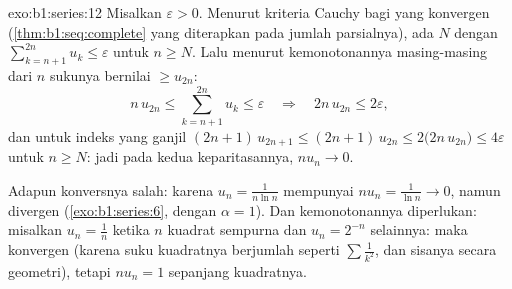 \begin{solution}{exo:b1:series:12}
Misalkan $\varepsilon > 0$. Menurut kriteria Cauchy bagi
 yang konvergen (\cref{thm:b1:seq:complete} yang diterapkan pada
jumlah parsialnya), ada $N$ dengan $\sum_{k=n+1}^{2n} u_k \leq
\varepsilon$ untuk $n \geq N$. Lalu menurut kemonotonannya masing-masing dari $n$
sukunya bernilai $\geq u_{2n}$:
\[
n\,u_{2n} \leq \sum_{k=n+1}^{2n} u_k \leq \varepsilon
\quad\Longrightarrow\quad 2n\,u_{2n} \leq 2\varepsilon ,
\]
dan untuk indeks yang ganjil $(2n+1)\,u_{2n+1} \leq (2n+1)\,u_{2n} \leq
2\bigl(2n\,u_{2n}\bigr) \leq 4\varepsilon$ untuk $n \geq N$: jadi pada
kedua keparitasannya, $n u_n \to 0$.

Adapun konversnya salah: karena $u_n = \frac{1}{n\ln n}$ mempunyai $n u_n =
\frac{1}{\ln n} \to 0$, namun  divergen
(\cref{exo:b1:series:6}, dengan $\alpha = 1$). Dan kemonotonannya diperlukan:
misalkan $u_n = \frac1n$ ketika $n$ kuadrat sempurna dan $u_n =
2^{-n}$ selainnya: maka  konvergen (karena suku kuadratnya berjumlah
seperti $\sum \frac{1}{k^2}$, dan sisanya secara geometri), tetapi $n u_n =
1$ sepanjang kuadratnya.
\end{solution}

